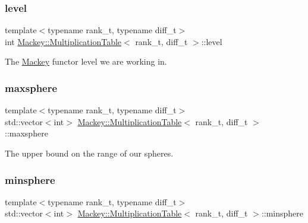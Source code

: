 \subsubsection{\texorpdfstring{level}{level}}
{\footnotesize\ttfamily template$<$typename rank\+\_\+t, typename diff\+\_\+t$>$ \\
int \hyperlink{classMackey_1_1MultiplicationTable}{Mackey\+::\+Multiplication\+Table}$<$ rank\+\_\+t, diff\+\_\+t $>$\+::level}



The \hyperlink{namespaceMackey}{Mackey} functor level we are working in. 

\mbox{\label{classMackey_1_1MultiplicationTable_a4355003c6be4a4f857eba151c8e5bcf6}} 
\subsubsection{\texorpdfstring{maxsphere}{maxsphere}}
{\footnotesize\ttfamily template$<$typename rank\+\_\+t, typename diff\+\_\+t$>$ \\
std\+::vector$<$int$>$ \hyperlink{classMackey_1_1MultiplicationTable}{Mackey\+::\+Multiplication\+Table}$<$ rank\+\_\+t, diff\+\_\+t $>$\+::maxsphere\hspace{0.3cm}{\ttfamily [protected]}}



The upper bound on the range of our spheres. 

\mbox{\label{classMackey_1_1MultiplicationTable_a071f7d7c6cd1c75836b64ea8e9923b49}} 
\subsubsection{\texorpdfstring{minsphere}{minsphere}}
{\footnotesize\ttfamily template$<$typename rank\+\_\+t, typename diff\+\_\+t$>$ \\
std\+::vector$<$int$>$ \hyperlink{classMackey_1_1MultiplicationTable}{Mackey\+::\+Multiplication\+Table}$<$ rank\+\_\+t, diff\+\_\+t $>$\+::minsphere\hspace{0.3cm}{\ttfamily [protected]}}




